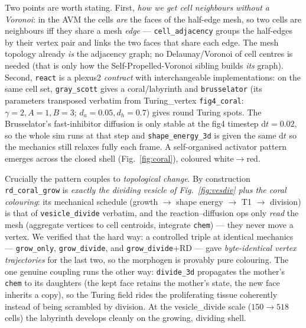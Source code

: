 \documentclass[11pt]{article}
\begin{document}
Two points are worth stating. First, \emph{how we get cell neighbours without a Voronoi}: in the AVM
the cells \emph{are} the faces of the half-edge mesh, so two cells are neighbours iff they share a mesh
\emph{edge} --- \texttt{cell\_adjacency} groups the half-edges by their vertex pair and links the two
faces that share each edge. The mesh topology already \emph{is} the adjacency graph; no Delaunay/Voronoi
of cell centres is needed (that is only how the Self-Propelled-Voronoi sibling builds \emph{its} graph).
Second, \texttt{react} is a plexus2 \emph{contract} with interchangeable implementations: on the same
cell set, \texttt{gray\_scott} gives a coral/labyrinth and \texttt{brusselator} (its parameters
transposed verbatim from Turing\_vertex \texttt{fig4\_coral}: $\gamma=2,A=1,B=3$; $d_a=0.05, d_h=0.7$)
gives round Turing spots. The Brusselator's fast-inhibitor diffusion is only stable at the fig4
timestep $\mathrm{d}t=0.02$, so the whole sim runs at that step and \texttt{shape\_energy\_3d} is given
the same $\mathrm{d}t$ so the mechanics still relaxes fully each frame. A self-organised activator
pattern emerges across the closed shell (Fig.~\ref{fig:coral}), coloured white$\to$red.

Crucially the pattern couples to \emph{topological change}. By construction \texttt{rd\_coral\_grow}
is \emph{exactly the dividing vesicle of Fig.~\ref{fig:vesdiv} plus the coral colouring}: its mechanical
schedule (growth $\to$ shape energy $\to$ T1 $\to$ division) is that of \texttt{vesicle\_divide}
verbatim, and the reaction--diffusion ops only \emph{read} the mesh (aggregate vertices to cell
centroids, integrate \texttt{chem}) --- they never move a vertex. We verified that the hard way: a
controlled triple at identical mechanics --- \texttt{grow\_only}, \texttt{grow\_divide}, and
\texttt{grow\_divide}$+$RD --- gave \emph{byte-identical vertex trajectories} for the last two, so the
morphogen is provably pure colouring. The one genuine coupling runs the other way:
\texttt{divide\_3d} propagates the mother's \texttt{chem} to its daughters (the kept face retains the
mother's state, the new face inherits a copy), so the Turing field rides the proliferating tissue
coherently instead of being scrambled by division. At the vesicle\_divide scale ($150\!\to\!518$ cells)
the labyrinth develops cleanly on the growing, dividing shell.
\end{document}
